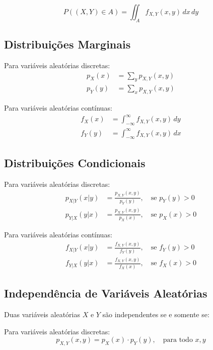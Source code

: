 \documentclass[a4paper,12pt]{article}
\begin{document}
\begin{equation}
P((X,Y) \in A) = \iint_A f_{X,Y}(x,y) \, dx \, dy
\end{equation}

\subsection{Distribuições Marginais}

Para variáveis aleatórias discretas:
\begin{align}
p_X(x) &= \sum_y p_{X,Y}(x,y) \\
p_Y(y) &= \sum_x p_{X,Y}(x,y)
\end{align}

Para variáveis aleatórias contínuas:
\begin{align}
f_X(x) &= \int_{-\infty}^{\infty} f_{X,Y}(x,y) \, dy \\
f_Y(y) &= \int_{-\infty}^{\infty} f_{X,Y}(x,y) \, dx
\end{align}

\subsection{Distribuições Condicionais}

Para variáveis aleatórias discretas:
\begin{align}
p_{X|Y}(x|y) &= \frac{p_{X,Y}(x,y)}{p_Y(y)}, \quad \text{se } p_Y(y) > 0 \\
p_{Y|X}(y|x) &= \frac{p_{X,Y}(x,y)}{p_X(x)}, \quad \text{se } p_X(x) > 0
\end{align}

Para variáveis aleatórias contínuas:
\begin{align}
f_{X|Y}(x|y) &= \frac{f_{X,Y}(x,y)}{f_Y(y)}, \quad \text{se } f_Y(y) > 0 \\
f_{Y|X}(y|x) &= \frac{f_{X,Y}(x,y)}{f_X(x)}, \quad \text{se } f_X(x) > 0
\end{align}

\subsection{Independência de Variáveis Aleatórias}

Duas variáveis aleatórias $X$ e $Y$ são independentes se e somente se:

Para variáveis aleatórias discretas:
\begin{equation}
p_{X,Y}(x,y) = p_X(x) \cdot p_Y(y), \quad \text{para todo } x, y
\end{equation}
\end{document}

